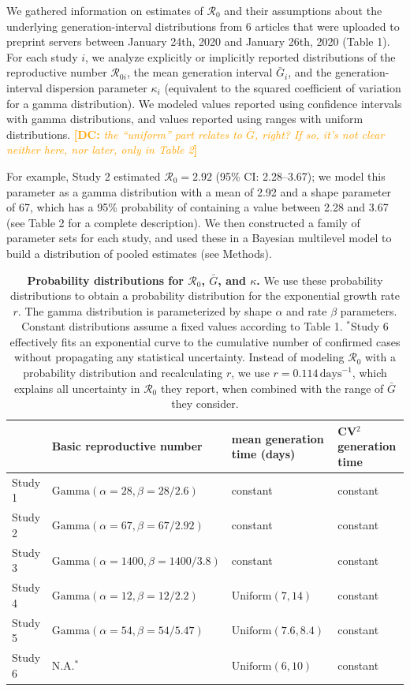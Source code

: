 \documentclass[12pt]{article}
\newcommand{\comment}[3]{\textcolor{#1}{\textbf{[#2: }\textsl{#3}\textbf{]}}}
\newcommand{\dc}[1]{\comment{Orange}{DC}{#1}}
\begin{document}
We gathered information on estimates of $\mathcal R_0$ and their assumptions about the underlying generation-interval distributions from 6 articles that were uploaded to preprint servers between January 24th, 2020 and January 26th, 2020 (Table 1).
For each study $i$, we analyze explicitly or implicitly reported distributions of the reproductive number $\mathcal R_{0i}$, the mean generation interval $\bar G_i$, and the generation-interval dispersion parameter $\kappa_i$ (equivalent to the squared coefficient of variation for a gamma distribution).
We modeled values reported using confidence intervals with gamma distributions, and values reported using ranges with uniform distributions.
\dc{the ``uniform'' part relates to $\bar{G}$, right? If so, it's not clear neither here, nor later, only in Table 2}

For example, Study 2 estimated $\mathcal R_0 = 2.92$ (95\% CI: 2.28--3.67);
we model this parameter as a gamma distribution with a mean of 2.92 and a shape parameter of 67, which has a 95\% probability of containing a value between 2.28 and 3.67 (see Table 2 for a complete description).
We then constructed a family of parameter sets for each study, and used these in a Bayesian multilevel model to build a distribution of pooled estimates (see Methods).

\begin{table}[t]
\begin{center}
\footnotesize
\begin{tabular}{l|l|l|l}
 & Basic reproductive number & mean generation time (days) & CV$^2$ generation time \\
\hline
Study 1 & $\mathrm{Gamma}(\alpha=28, \beta=28/2.6)$ & constant & constant \\
\hline
Study 2 & $\mathrm{Gamma}(\alpha=67, \beta=67/2.92)$ & constant & constant \\
\hline
Study 3 & $\mathrm{Gamma}(\alpha=1400, \beta=1400/3.8)$ & constant & constant \\
\hline
Study 4 & $\mathrm{Gamma}(\alpha=12, \beta=12/2.2)$ & $\mathrm{Uniform}(7, 14)$ & constant\\
\hline
Study 5 & $\mathrm{Gamma}(\alpha=54, \beta=54/5.47)$ & $\mathrm{Uniform}(7.6, 8.4)$ & constant\\
\hline
Study 6 & N.A.$^\ast$ & $\mathrm{Uniform}(6, 10)$ & constant\\
\hline
\end{tabular}
\end{center}
\caption{
\textbf{Probability distributions for $\mathcal R_0$, $\bar G$, and $\kappa$.}
We use these probability distributions to obtain a probability distribution for the exponential growth rate $r$.
The gamma distribution is parameterized by shape $\alpha$ and rate $\beta$ parameters.
Constant distributions assume a fixed values according to Table 1.
$^\ast$Study 6 effectively fits an exponential curve to the cumulative number of confirmed cases without propagating any statistical uncertainty.
Instead of modeling $\mathcal R_0$ with a probability distribution and recalculating $r$, we use $r=0.114\,\mathrm{days}^{-1}$, which explains all uncertainty in $\mathcal R_0$ they report, when combined with the range of $\bar G$ they consider.
}
\end{table}
\end{document}
